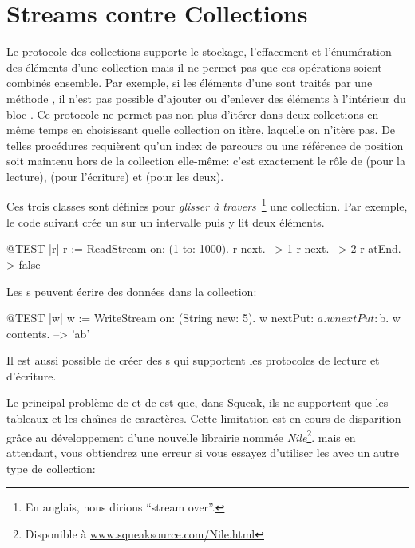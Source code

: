 \documentclass[a4paper,10pt,twoside]{book}
\begin{document}
\section{Streams contre Collections}

Le protocole des collections supporte le stockage, l'effacement et l'\'enum\'eration
des \'el\'ements d'une collection mais il ne permet pas que ces op\'erations
soient combin\'es ensemble. Par exemple, si les \'el\'ements d'une 
 sont trait\'es par une m\'ethode , il n'est pas possible d'ajouter ou d'enlever des \'el\'ements
\`a l'int\'erieur du bloc .
Ce protocole ne permet pas non plus d'it\'erer dans deux collections
en m\^eme temps en choisissant quelle collection on itère, laquelle on n'itère pas.
De telles proc\'edures requi\`erent qu'un index de parcours ou une r\'ef\'erence
de position soit maintenu hors de la collection elle-m\^eme:
c'est exactement le r\^ole de  
 (pour la lecture),  (pour l'\'ecriture) et  (pour les deux).

Ces trois classes sont d\'efinies pour \emph{glisser à travers}~\footnote{En anglais, nous dirions ``stream over''.} une collection.
Par exemple, le code suivant cr\'ee un \stream sur un intervalle puis y lit deux \'el\'ements.
\begin{code}{@TEST |r|}
r := ReadStream on: (1 to: 1000).
r next.   --> 1
r next.   --> 2
r atEnd.--> false
\end{code}

Les s peuvent \'ecrire des donn\'ees dans la collection:
\begin{code}{@TEST |w|}
w := WriteStream on: (String new: 5).
w nextPut: $a.
w nextPut: $b.
w contents. -->  'ab'
\end{code}

Il est aussi possible de cr\'eer des s qui supportent
les protocoles de lecture et d'\'ecriture.

Le principal probl\`eme de  et de 
est que, dans Squeak, ils ne supportent que les tableaux et les 
cha\^{\i}nes de caract\`eres. Cette limitation est en cours de
disparition gr\^ace au d\'eveloppement d'une nouvelle librairie
nomm\'ee \emph{Nile}\footnote{Disponible \`a \url{www.squeaksource.com/Nile.html}}. mais en attendant, vous obtiendrez une erreur
si vous essayez d'utiliser les \streams avec un autre type de collection:
\end{document}
